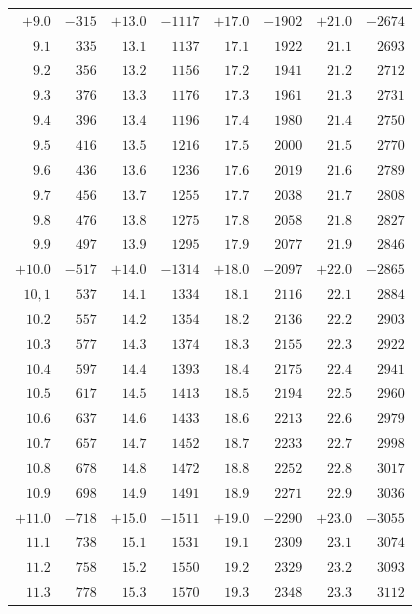 \begin{center}
{{\begin{minipage}[t][500pt][t]{.96\linewidth}
{\begin{tabular}{r|r||r|r||r|r||r|r}
$+9.0$ & $-315$ & $+13.0$ & $-1117$ & $+17.0$ & $-1902$ & $+21.0$ & $-2674$\\
$9.1$ & $335$ & $13.1$ & $1137$ & $17.1$ & $1922$ & $21.1$ & $2693$\\
$9.2$ & $356$ & $13.2$ & $1156$ & $17.2$ & $1941$ & $21.2$ & $2712$\\
$9.3$ & $376$ & $13.3$ & $1176$ & $17.3$ & $1961$ & $21.3$ & $2731$\\
$9.4$ & $396$ & $13.4$ & $1196$ & $17.4$ & $1980$ & $21.4$ & $2750$\\
$9.5$ & $416$ & $13.5$ & $1216$ & $17.5$ & $2000$ & $21.5$ & $2770$\\
$9.6$ & $436$ & $13.6$ & $1236$ & $17.6$ & $2019$ & $21.6$ & $2789$\\
$9.7$ & $456$ & $13.7$ & $1255$ & $17.7$ & $2038$ & $21.7$ & $2808$\\
$9.8$ & $476$ & $13.8$ & $1275$ & $17.8$ & $2058$ & $21.8$ & $2827$\\
$9.9$ & $497$ & $13.9$ & $1295$ & $17.9$ & $2077$ & $21.9$ & $2846$\\[4pt]
$+10.0$ & $-517$ & $+14.0$ & $-1314$ & $+18.0$ & $-2097$ & $+22.0$ & $-2865$\\
$10{,}1$ & $537$ & $14.1$ & $1334$ & $18.1$ & $2116$ & $22.1$ & $2884$\\
$10.2$ & $557$ & $14.2$ & $1354$ & $18.2$ & $2136$ & $22.2$ & $2903$\\
$10.3$ & $577$ & $14.3$ & $1374$ & $18.3$ & $2155$ & $22.3$ & $2922$\\
$10.4$ & $597$ & $14.4$ & $1393$ & $18.4$ & $2175$ & $22.4$ & $2941$\\
$10.5$ & $617$ & $14.5$ & $1413$ & $18.5$ & $2194$ & $22.5$ & $2960$\\
$10.6$ & $637$ & $14.6$ & $1433$ & $18.6$ & $2213$ & $22.6$ & $2979$\\
$10.7$ & $657$ & $14.7$ & $1452$ & $18.7$ & $2233$ & $22.7$ & $2998$\\
$10.8$ & $678$ & $14.8$ & $1472$ & $18.8$ & $2252$ & $22.8$ & $3017$\\
$10.9$ & $698$ & $14.9$ & $1491$ & $18.9$ & $2271$ & $22.9$ & $3036$\\[4pt]
$+11.0$ & $-718$ & $+15.0$ & $-1511$ & $+19.0$ & $-2290$ & $+23.0$ & $-3055$\\
$11.1$ & $738$ & $15.1$ & $1531$ & $19.1$ & $2309$ & $23.1$ & $3074$\\
$11.2$ & $758$ & $15.2$ & $1550$ & $19.2$ & $2329$ & $23.2$ & $3093$\\
$11.3$ & $778$ & $15.3$ & $1570$ & $19.3$ & $2348$ & $23.3$ & $3112$\\

\end{tabular}}
\end{minipage}}}
\end{center}
